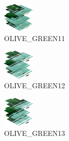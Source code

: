 \hspace{0.1cm}
\begin{minipage}[b]{0.15\linewidth}
\begin{figure}[H]                                                          
  \centering                                                             
  \begin{adjustbox}{width=1.5cm,center}                                   
  \includegraphics[width=1.5cm]{src/colorspace_colourflow/flows/colourflow_187-45.png}%
  \end{adjustbox}                                                        
\caption*{OLIVE\_GREEN11}                                           
\end{figure}                                                               
\end{minipage}
\hspace{0.1cm}
\begin{minipage}[b]{0.15\linewidth}
\begin{figure}[H]                                                          
  \centering                                                             
  \begin{adjustbox}{width=1.5cm,center}                                   
  \includegraphics[width=1.5cm]{src/colorspace_colourflow/flows/colourflow_188-45.png}%
  \end{adjustbox}                                                        
\caption*{OLIVE\_GREEN12}                                           
\end{figure}                                                               
\end{minipage}
\hspace{0.1cm}
\begin{minipage}[b]{0.15\linewidth}
\begin{figure}[H]                                                          
  \centering                                                             
  \begin{adjustbox}{width=1.5cm,center}                                   
  \includegraphics[width=1.5cm]{src/colorspace_colourflow/flows/colourflow_189-45.png}%
  \end{adjustbox}                                                        
\caption*{OLIVE\_GREEN13}                                           
\end{figure}                                                               
\end{minipage}
